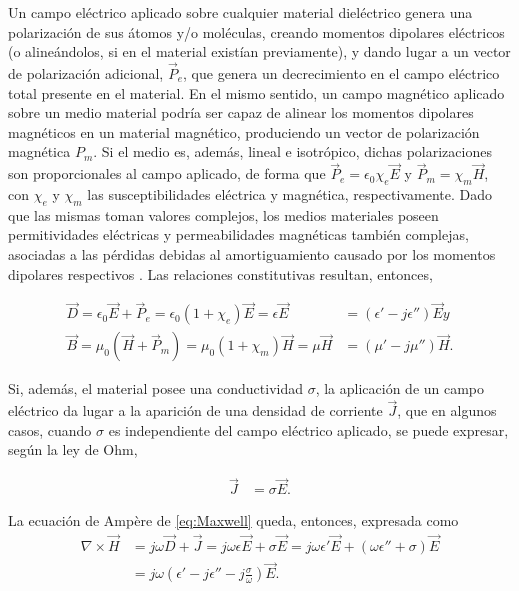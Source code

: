 Un campo eléctrico aplicado sobre cualquier material dieléctrico genera una polarización de sus átomos y/o moléculas, creando momentos dipolares eléctricos (o alineándolos, si en el material existían previamente), y dando lugar a un vector de polarización adicional, $\vec{P}_e$, que genera un decrecimiento en el campo eléctrico total presente en el material. En el mismo sentido, un campo magnético aplicado sobre un medio material podría ser capaz de alinear los momentos dipolares magnéticos en un material magnético, produciendo un vector de polarización magnética $P_m$. Si el medio es, además, lineal e isotrópico, dichas polarizaciones son proporcionales al campo aplicado, de forma que $\vec{P}_e = \epsilon_0 \chi_e \vec{E}$ y $\vec{P}_m = \chi_m \vec{H}$, con $\chi_e$ y $\chi_m$ las susceptibilidades eléctrica y magnética, respectivamente. Dado que las mismas toman valores complejos, los medios materiales poseen permitividades eléctricas y permeabilidades magnéticas también complejas, asociadas a las pérdidas debidas al amortiguamiento causado por los momentos dipolares respectivos \cite{Fernandez:Electromag}. Las relaciones constitutivas resultan, entonces,

\begin{subequations}
	\label{eq:polarization_vector}
	\begin{align}
		\vec{D} = \epsilon_0 \vec{E} + \vec{P}_e = \epsilon_0 (1+\chi_e)\vec{E} = \epsilon \vec{E} &= (\epsilon' - j \epsilon'') \vec{E} y\\
		\vec{B} = \mu_0 (\vec{H} + \vec{P}_m) = \mu_0 (1+\chi_m)\vec{H} = \mu \vec{H} &= (\mu' - j \mu'') \vec{H}.
	\end{align}
\end{subequations}

Si, además, el material posee una conductividad $\sigma$, la aplicación de un campo eléctrico da lugar a la aparición de una densidad de corriente $\vec{J}$, que en algunos casos, cuando $\sigma$ es independiente del campo eléctrico aplicado, se puede expresar, según la ley de Ohm,

\begin{align}
	\label{eq:ohms_law}
	\vec{J} &= \sigma \vec{E}.
\end{align}

La ecuación de Ampère de \ref{eq:Maxwell} queda, entonces, expresada como
\begin{subequations}
	\begin{align}
		\nabla \times \vec{H} & = j \omega \vec{D} + \vec{J} = j \omega \epsilon \vec{E} + \sigma \vec{E} = j \omega \epsilon' \vec{E} + (\omega \epsilon'' + \sigma)\vec{E}\\
		& = j \omega \left( \epsilon' - j\epsilon'' - j \frac{\sigma}{\omega} \right) \vec{E}.
	\end{align}
\end{subequations}

